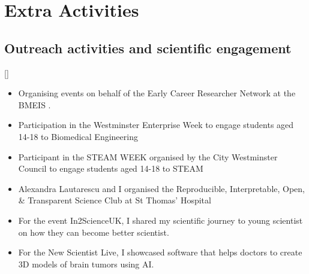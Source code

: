 \documentclass{mycv}
\begin{document}
\section{Extra Activities}
\subsection{Outreach activities and scientific engagement}[]
\begin{itemize}
\item Organising events on behalf of the Early Career Researcher Network at the BMEIS .
\item Participation in the Westminster Enterprise Week to engage students aged 14-18 to Biomedical Engineering 
\item Participant in the STEAM WEEK organised by the City Westminster Council to engage students aged 14-18 to STEAM \href{https://twitter.com/_mxochicale/status/1374407825607200769}{\faTwitter} 
\item Alexandra Lautarescu and I organised the Reproducible, Interpretable, Open, \& Transparent Science Club at St Thomas' Hospital 
\item For the event In2ScienceUK, I shared my scientific journey to young scientist on how they can become better scientist.  
\item For the New Scientist Live, I showcased software that helps doctors to create 3D models of brain tumors using AI. 



\end{itemize}
\end{document}
